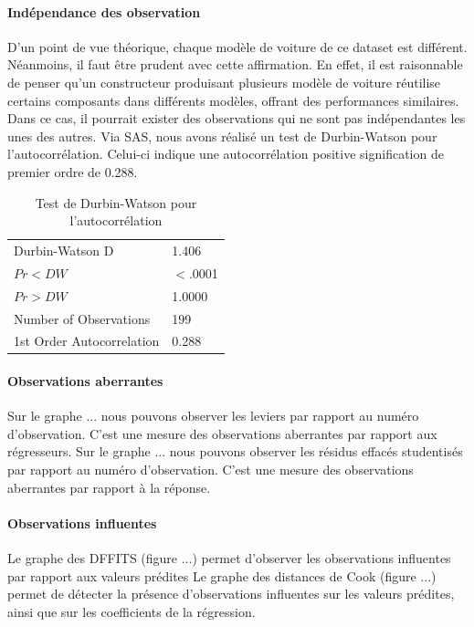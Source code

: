 \documentclass[11pt,a4paper]{article}
\begin{document}
\paragraph{Indépendance des observation} D'un point de vue théorique, chaque modèle de voiture de ce dataset est différent. Néanmoins, il faut être prudent avec cette affirmation. En effet, il est raisonnable de penser qu'un constructeur produisant plusieurs modèle de voiture réutilise certains composants dans différents modèles, offrant des performances similaires. Dans ce cas, il pourrait exister des observations qui ne sont pas indépendantes les unes des autres. Via SAS, nous avons réalisé un test de Durbin-Watson pour l'autocorrélation. Celui-ci indique une autocorrélation positive signification de premier ordre de 0.288.
\begin{table}
	\scriptsize
	\centering
	\begin{tabulary}{1\textwidth}{LL}
		\hline
		 Durbin-Watson D &    1.406\\
		$Pr < DW$ &    $<$.0001\\
		$Pr > DW $&    1.0000\\
		Number of Observations &    199\\
		1st Order Autocorrelation &    0.288\\\hline
	\end{tabulary}
	\caption{Test de Durbin-Watson pour l'autocorrélation}
	\label{table:}
\end{table}
\paragraph{Observations aberrantes}
Sur le graphe ... nous pouvons observer les leviers par rapport au numéro d'observation. C'est une mesure des observations aberrantes par rapport aux régresseurs.
Sur le graphe ... nous pouvons observer les résidus effacés studentisés par rapport au numéro d'observation. C'est une mesure des observations aberrantes par rapport  à la réponse.

\paragraph{Observations influentes} Le graphe des DFFITS (figure ...) permet d'observer les observations influentes par rapport aux valeurs prédites
Le graphe des distances de Cook (figure ...) permet de détecter la présence d'observations influentes sur les valeurs prédites, ainsi que sur les coefficients de la régression.
\end{document}
